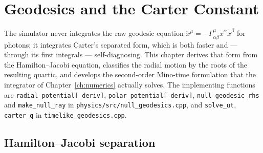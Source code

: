 \chapter{Geodesics and the Carter Constant}
\label{ch:geodesics}

The simulator never integrates the raw geodesic equation
$\ddot x^\mu = -\Gamma^\mu_{\alpha\beta}\dot x^\alpha \dot x^\beta$ for
photons; it integrates Carter's separated form, which is both faster and
— through its first integrals — self-diagnosing. This chapter derives
that form from the Hamilton--Jacobi equation, classifies the radial
motion by the roots of the resulting quartic, and develops the
second-order Mino-time formulation that the integrator of
Chapter~\ref{ch:numerics} actually solves. The implementing functions are
\texttt{radial\_potential[\_deriv]}, \texttt{polar\_potential[\_deriv]},
\texttt{null\_geodesic\_rhs} and \texttt{make\_null\_ray} in
\texttt{physics/src/null\_geodesics.cpp}, and \texttt{solve\_ut},
\texttt{carter\_q} in \texttt{timelike\_geodesics.cpp}.

\section{Hamilton--Jacobi separation}
\label{sec:hj}

